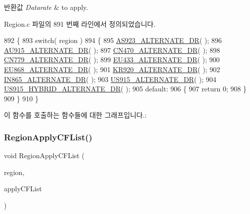 \begin{DoxyRetVals}{반환값}
{\em Datarate} & to apply. \\
\hline
\end{DoxyRetVals}


Region.\+c 파일의 891 번째 라인에서 정의되었습니다.


\begin{DoxyCode}
892 \{
893     \textcolor{keywordflow}{switch}( region )
894     \{
895         \mbox{\hyperlink{_region_8c_a9fc7f64a847307af6e86178f94ad35e7}{AS923\_ALTERNATE\_DR}}( );
896         \mbox{\hyperlink{_region_8c_a44bd9ed442b08a08d8955071c1062152}{AU915\_ALTERNATE\_DR}}( );
897         \mbox{\hyperlink{_region_8c_a72d269f5dced042d846b04f9d9074654}{CN470\_ALTERNATE\_DR}}( );
898         \mbox{\hyperlink{_region_8c_ada1de89215c8ec0cc74ee666691ee25f}{CN779\_ALTERNATE\_DR}}( );
899         \mbox{\hyperlink{_region_8c_aea032b0029fae6249afb16fe69a46387}{EU433\_ALTERNATE\_DR}}( );
900         \mbox{\hyperlink{_region_8c_aa7a1fb6ffbb2e441f77c1cc2a2a48de0}{EU868\_ALTERNATE\_DR}}( );
901         \mbox{\hyperlink{_region_8c_a95b3a7d29d8071bb9f2b847fe03f8b3c}{KR920\_ALTERNATE\_DR}}( );
902         \mbox{\hyperlink{_region_8c_a127631af76800012d4c9e606bbc121d9}{IN865\_ALTERNATE\_DR}}( );
903         \mbox{\hyperlink{_region_8c_a8856aae4d1d782afb5a4e6c6cafc5830}{US915\_ALTERNATE\_DR}}( );
904         \mbox{\hyperlink{_region_8c_aebcca0091950e77002659b6312250374}{US915\_HYBRID\_ALTERNATE\_DR}}( );
905         \textcolor{keywordflow}{default}:
906         \{
907             \textcolor{keywordflow}{return} 0;
908         \}
909     \}
910 \}
\end{DoxyCode}
이 함수를 호출하는 함수들에 대한 그래프입니다.\+:
\mbox{\label{group___r_e_g_i_o_n_gae3fdd82182ebb0704adb2a017d30e1f2}} 
\subsubsection{\texorpdfstring{Region\+Apply\+C\+F\+List()}{RegionApplyCFList()}}
{\footnotesize\ttfamily void Region\+Apply\+C\+F\+List (\begin{DoxyParamCaption}\item[{\mbox{\hyperlink{group___l_o_r_a_m_a_c_ga80c48efda9ae02e14b58160d34a798dd}{Lo\+Ra\+Mac\+Region\+\_\+t}}}]{region,  }\item[{\mbox{\hyperlink{group___r_e_g_i_o_n_ga71588e9ad07e34b78fa91d51881fd3c6}{Apply\+C\+F\+List\+Params\+\_\+t}} $\ast$}]{apply\+C\+F\+List }\end{DoxyParamCaption})}



